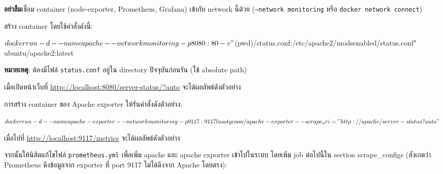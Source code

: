 \documentclass[a4paper, 10pt]{article}
\begin{document}
\par\noindent \textthai{\textbf{อย่าลืม}เชื่อม} container (node-exporter, Prometheus, Grafana)
\textthai{เข้ากับ} network \textthai{นี้ด้วย} (\texttt{--network monitoring} \textthai{หรือ} \texttt{docker network connect})

\par\noindent \textthai{สร้าง} container \textthai{โดยใช้คำสั่งดังนี้}:
\begin{codingbox}[language=bash]
$ docker run -d --name apache --network monitoring -p 8080:80 -v "$(pwd)/status.conf:/etc/apache2/modsenabled/status.conf" ubuntu/apache2:latest
\end{codingbox}

\par\noindent \textbf{\textthai{หมายเหตุ}}: \textthai{ต้องมีไฟล์} \texttt{status.conf}
\textthai{อยู่ใน} directory \textthai{ปัจจุบันก่อนรัน} (\textthai{ใช้} absolute path)

\par\noindent \textthai{เมื่อเปิดหน้าเว็บที่} \url{http://localhost:8080/server-status/?auto}
\textthai{จะได้ผลลัพธ์ดังตัวอย่าง}

\par\noindent \textthai{การสร้าง} container \textthai{ของ} Apache exporter \textthai{ให้รันคำสั่งดังตัวอย่าง}:
\begin{codingbox}[language=bash]
$ docker run -d --name apache-exporter --network monitoring -p 9117:9117 lusotycoon/apache-exporter --scrape_uri="http://apache/server-status?auto"
$
\end{codingbox}

\par\noindent \textthai{เมื่อไปที่} \url{http://localhost:9117/metrics} \textthai{จะได้ผลลัพธ์ดังตัวอย่าง}

\par\noindent \textthai{จากนั้นให้นิสิตแก้ไขไฟล์} \texttt{prometheus.yml}
\textthai{เพื่อเพิ่ม} apache \textthai{และ} apache exporter \textthai{เข้าไปในระบบ}
\textthai{โดยเพิ่ม} job \textthai{ต่อไปนี้ใน} section scrape\_configs
(\textthai{สังเกตว่า} Prometheus \textthai{ดึงข้อมูลจาก} exporter \textthai{ที่} port 9117
\textthai{ไม่ได้ดึงจาก} Apache \textthai{โดยตรง}):
\end{document}
